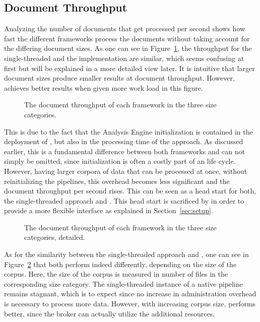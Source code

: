 \subsection{Document Throughput}
Analyzing the number of documents that get processed per second shows how fast the different frameworks process the documents without taking account for the differing document sizes. As one can see in Figure~\ref{fig:result:throughput}, the throughput for the single-threaded \uima{} and the \uimaas{} implementation are similar, which seems confusing at first but will be explained in a more detailed view later. It is intuitive that larger document sizes produce smaller results at document throughput. However, \spark{} achieves better results when given more work load in this figure.
\begin{figure}[!htb]
	\centering
	\resizebox{1.\linewidth}{!}{\small}
	\caption[The document throughput of each framework in the three size categories.]{The document throughput of each framework in the three size categories.}
	\label{fig:result:throughput}
\end{figure}
This is due to the fact that the Analysis Engine initialization is contained in the deployment of \uimaas{}, but also in the processing time of the \spark{} approach. As discussed earlier, this is a fundamental difference between both frameworks and can not simply be omitted, since initialization is often a costly part of an \anen{} life cycle. However, having larger corpora of data that can be processed at once, without reinitializing the pipelines, this overhead becomes less significant and the document throughput per second rises. This can be seen as a head start for both, the single-threaded approach and \uimaas{}. This head start is sacrificed by \spark{} in order to provide a more flexible interface as explained in Section~\ref{sec:setup}.
\begin{figure}[htb]
	\centering
	\resizebox{1.\linewidth}{!}{\small}
	\caption{The document throughput of each framework in the three size categories, detailed.}
	\label{fig:result:throughput_det}
\end{figure}
As for the similarity between the single-threaded approach and \uimaas{}, one can see in Figure~\ref{fig:result:throughput_det} that both perform indeed differently, depending on the size of the corpus. Here, the size of the corpus is measured in number of files in the corresponding size category. The single-threaded instance of a native \uima{} pipeline remains stagnant, which is to expect since no increase in administration overhead is necessary to process more data. However, with increasing corpus size, \uimaas{} performs better, since the broker can actually utilize the additional resources.

